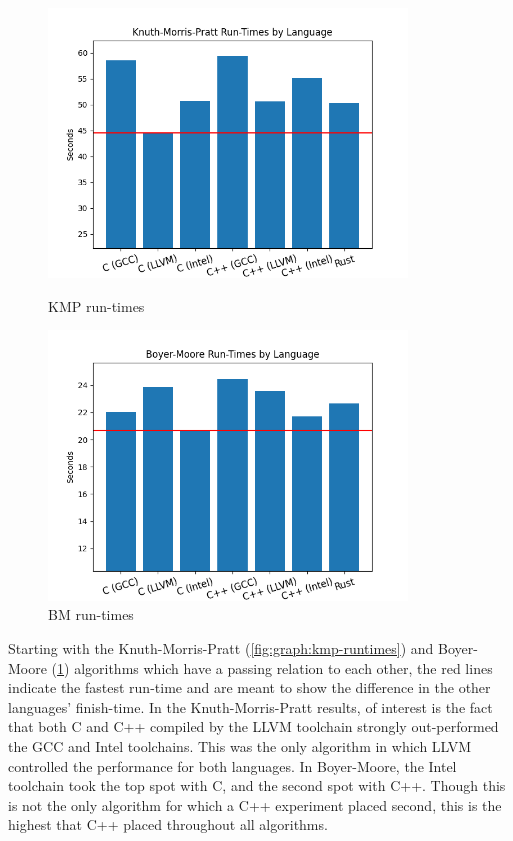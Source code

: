 \begin{figure}[ht]
    \centering
    \begin{minipage}[t]{0.45\textwidth}
        \centering
        \includegraphics[width=0.85\textwidth]{figures/algorithm_runtimes-kmp.png}
        \caption{KMP run-times}
        \label{fig:graph:kmp-runtimes}
    \end{minipage}\hfill
    \begin{minipage}[t]{0.45\textwidth}
        \centering
        \includegraphics[width=0.85\textwidth]{figures/algorithm_runtimes-boyer_moore.png}
        \caption{BM run-times}
        \label{fig:graph:bm-runtimes}
    \end{minipage}
\end{figure}

Starting with the Knuth-Morris-Pratt (\ref{fig:graph:kmp-runtimes}) and Boyer-Moore (\ref{fig:graph:bm-runtimes}) algorithms which have a passing relation to each other, the red lines indicate the fastest run-time and are meant to show the difference in the other languages' finish-time. In the Knuth-Morris-Pratt results, of interest is the fact that both C and C++ compiled by the LLVM toolchain strongly out-performed the GCC and Intel toolchains. This was the only algorithm in which LLVM controlled the performance for both languages. In Boyer-Moore, the Intel toolchain took the top spot with C, and the second spot with C++. Though this is not the only algorithm for which a C++ experiment placed second, this is the highest that C++ placed throughout all algorithms.

